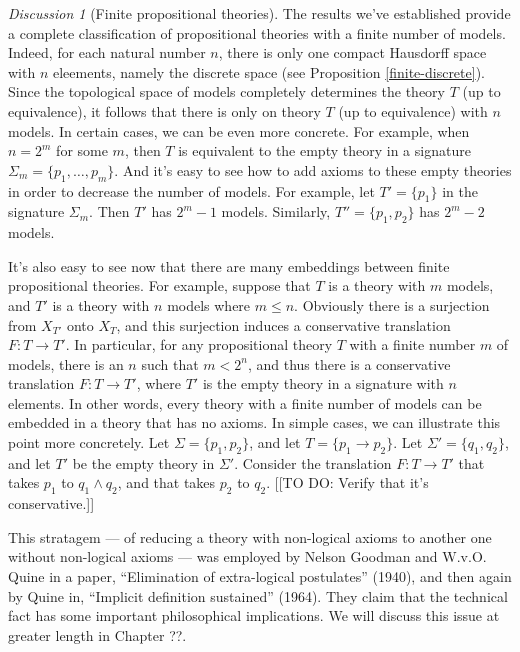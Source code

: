 \documentclass[11pt]{article}
\theoremstyle{definition}
\theoremstyle{remark}
\newtheorem*{disc}{Discussion}
\begin{document}
\begin{disc}[Finite propositional theories] The results we've
  established provide a complete classification of propositional
  theories with a finite number of models.  Indeed, for each natural
  number $n$, there is only one compact Hausdorff space with $n$
  eleements, namely the discrete space (see Proposition
  \ref{finite-discrete}).  Since the topological space of models
  completely determines the theory $T$ (up to equivalence), it follows
  that there is only on theory $T$ (up to equivalence) with $n$
  models.  In certain cases, we can be even more concrete.  For
  example, when $n=2^m$ for some $m$, then $T$ is equivalent to the
  empty theory in a signature $\Sigma _m =\{ p_1,\dots ,p_m\}$.  And
  it's easy to see how to add axioms to these empty theories in order
  to decrease the number of models.  For example, let $T'=\{ p_1\}$ in
  the signature $\Sigma _m$.  Then $T'$ has $2^m-1$ models.
  Similarly, $T''=\{ p_1,p_2 \}$ has $2^m-2$ models.

  It's also easy to see now that there are many embeddings between
  finite propositional theories.  For example, suppose that $T$ is a
  theory with $m$ models, and $T'$ is a theory with $n$ models where
  $m\leq n$.  Obviously there is a surjection from $X_{T'}$ onto
  $X_{T}$, and this surjection induces a conservative translation
  $F:T\to T'$.  In particular, for any propositional theory $T$ with a
  finite number $m$ of models, there is an $n$ such that $m<2^n$, and
  thus there is a conservative translation $F:T\to T'$, where $T'$ is
  the empty theory in a signature with $n$ elements.  In other words,
  every theory with a finite number of models can be embedded in a
  theory that has no axioms.  In simple cases, we can illustrate this
  point more concretely.  Let $\Sigma =\{ p_1,p_2 \}$, and let $T = \{
  p_1\to p_2\}$.  Let $\Sigma '=\{ q_1,q_2 \}$, and let $T'$ be the
  empty theory in $\Sigma '$.  Consider the translation $F:T\to T'$
  that takes $p_1$ to $q_1\wedge q_2$, and that takes $p_2$ to $q_2$.
  [[TO DO: Verify that it's conservative.]]

  This stratagem --- of reducing a theory with non-logical axioms to
  another one without non-logical axioms --- was employed by Nelson
  Goodman and W.v.O. Quine in a paper, ``Elimination of extra-logical
  postulates'' (1940), and then again by Quine in, ``Implicit
  definition sustained'' (1964).  They claim that the technical fact
  has some important philosophical implications.  We will discuss this
  issue at greater length in Chapter ??.


\end{disc}
\end{document}
